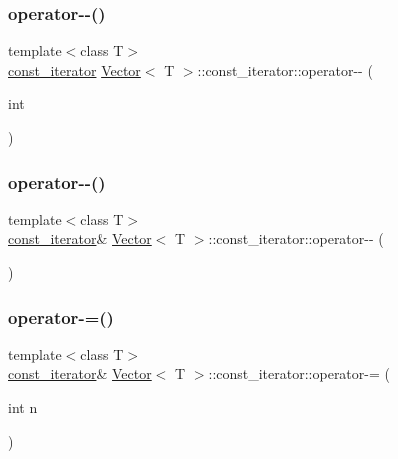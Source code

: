 \subsubsection{\texorpdfstring{operator-\/-\/()}{operator--()}\hspace{0.1cm}{\footnotesize\ttfamily [1/2]}}
{\footnotesize\ttfamily template$<$class T$>$ \\
\hyperlink{classVector_1_1const__iterator}{const\+\_\+iterator} \hyperlink{classVector}{Vector}$<$ T $>$\+::const\+\_\+iterator\+::operator-\/-\/ (\begin{DoxyParamCaption}\item[{int}]{ }\end{DoxyParamCaption})\hspace{0.3cm}{\ttfamily [inline]}}

\mbox{\label{classVector_1_1const__iterator_a1040c4e1ecb2780da4a94449eef6690f_a1040c4e1ecb2780da4a94449eef6690f}} 
\subsubsection{\texorpdfstring{operator-\/-\/()}{operator--()}\hspace{0.1cm}{\footnotesize\ttfamily [2/2]}}
{\footnotesize\ttfamily template$<$class T$>$ \\
\hyperlink{classVector_1_1const__iterator}{const\+\_\+iterator}\& \hyperlink{classVector}{Vector}$<$ T $>$\+::const\+\_\+iterator\+::operator-\/-\/ (\begin{DoxyParamCaption}{ }\end{DoxyParamCaption})\hspace{0.3cm}{\ttfamily [inline]}}

\mbox{\label{classVector_1_1const__iterator_af223a63e9a0587781de597ef50f3b7db_af223a63e9a0587781de597ef50f3b7db}} 
\subsubsection{\texorpdfstring{operator-\/=()}{operator-=()}}
{\footnotesize\ttfamily template$<$class T$>$ \\
\hyperlink{classVector_1_1const__iterator}{const\+\_\+iterator}\& \hyperlink{classVector}{Vector}$<$ T $>$\+::const\+\_\+iterator\+::operator-\/= (\begin{DoxyParamCaption}\item[{int}]{n }\end{DoxyParamCaption})\hspace{0.3cm}{\ttfamily [inline]}}

